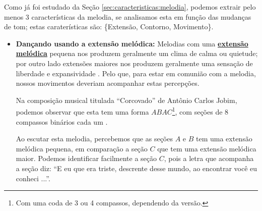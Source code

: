 Como já foi estudado da Seção \ref{sec:caracteristicas:melodia},
podemos extrair pelo menos 3 características da melodia,
se analisamos esta em função das mudanças de tom;
estas caraterísticas são:
\{Extensão, Contorno, Movimento\}.
 
\begin{itemize}
\item \textbf{Dançando usando a extensão melódica:}
Melodias com uma \hyperref[ref:melodica:range]{\textbf{extensão melódica}} 
pequena nos produzem geralmente um clima de calma ou quietude;
por outro lado extensões maiores nos produzem geralmente uma sensação de liberdade e expansividade
 \cite[pp. 43]{holland2013music}.
Pelo que, para estar em comunião com a melodia, nossos movimentos deveriam acompanhar estas percepções.
\begin{example}
Na composição musical titulada ``Corcovado''  de Antônio Carlos Jobim,
podemos observar que esta tem uma forma $ABAC$\footnote{Com uma coda de 3 ou 4 compassos, dependendo da versão.},
com seções de 8 compassos binários cada um \cite{partituracorcovado1} \cite[pp. 53]{colluraimprovisacao}.

Ao escutar esta melodia, percebemos que as seções $A$ e $B$ tem uma extensão melódica pequena,
em comparação a seção $C$ que tem uma extensão melódica maior. 
Podemos identificar facilmente a seção $C$, pois a letra que acompanha a seção diz:
``E eu que era triste, descrente desse mundo, ao encontrar você eu conheci ...''.


\end{example}
\end{itemize}
